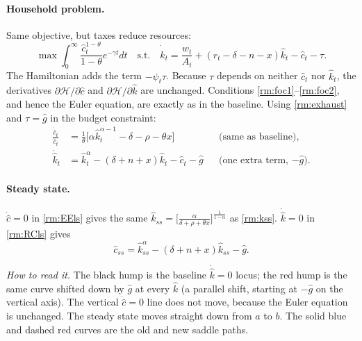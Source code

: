 \paragraph{Household problem.} Same objective, but taxes reduce resources:
\[
\max\int_0^\infty\frac{\hat c_t^{1-\theta}}{1-\theta}e^{-\gamma t}dt\quad\text{s.t.}\quad
\dot{\hat k}_t=\frac{w_t}{A_t}+(r_t-\delta-n-x)\hat k_t-\hat c_t-\tau .
\]
The Hamiltonian adds the term $-\psi_t\tau$. Because $\tau$ depends on neither $\hat c_t$ nor $\hat k_t$, the derivatives $\partial\mathcal H/\partial\hat c$ and $\partial\mathcal H/\partial\hat k$ are unchanged. Conditions \eqref{rm:foc1}--\eqref{rm:foc2}, and hence the Euler equation, are exactly as in the baseline. Using \eqref{rm:exhaust} and $\tau=\hat g$ in the budget constraint:
\begin{align}
\frac{\dot{\hat c}_t}{\hat c_t}&=\frac1\theta\big[\alpha\hat k_t^{\alpha-1}-\delta-\rho-\theta x\big] &&\text{(same as baseline)}, \label{rm:EEls}\\
\dot{\hat k}_t&=\hat k_t^\alpha-(\delta+n+x)\hat k_t-\hat c_t-\hat g &&\text{(one extra term, $-\hat g$)}. \label{rm:RCls}
\end{align}

\paragraph{Steady state.} $\dot{\hat c}=0$ in \eqref{rm:EEls} gives the same $\hat k_{ss}=\big[\frac{\alpha}{\delta+\rho+\theta x}\big]^{\frac1{1-\alpha}}$ as \eqref{rm:kss}. $\dot{\hat k}=0$ in \eqref{rm:RCls} gives
\[
\hat c_{ss}=\hat k_{ss}^\alpha-(\delta+n+x)\hat k_{ss}-\hat g .
\]

\begin{center}
\end{center}
\emph{How to read it.} The black hump is the baseline $\dot{\hat k}=0$ locus; the red hump is the same curve shifted down by $\hat g$ at every $\hat k$ (a parallel shift, starting at $-\hat g$ on the vertical axis). The vertical $\dot{\hat c}=0$ line does not move, because the Euler equation is unchanged. The steady state moves straight down from $a$ to $b$. The solid blue and dashed red curves are the old and new saddle paths.

